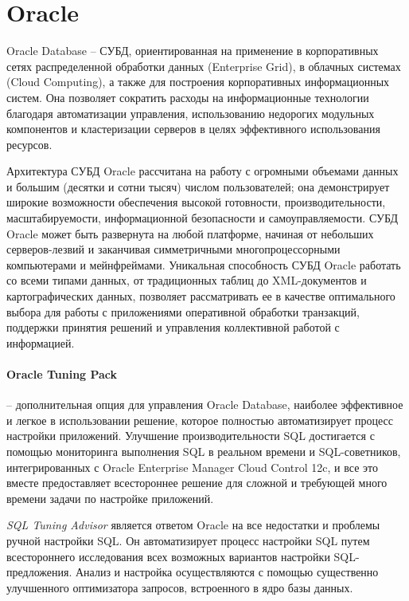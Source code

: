 \section{Oracle}

Oracle Database – СУБД, ориентированная на применение в корпоративных сетях распределенной обработки данных (Enterprise Grid), в облачных системах (Cloud Computing), а также для построения корпоративных информационных систем. Она позволяет сократить расходы на информационные технологии благодаря автоматизации управления, использованию недорогих модульных компонентов и кластеризации серверов в целях эффективного использования ресурсов. 

Архитектура СУБД Oracle рассчитана на работу с огромными объемами данных и большим (десятки и сотни тысяч) числом пользователей; она демонстрирует широкие возможности обеспечения высокой готовности, производительности, масштабируемости, информационной безопасности и самоуправляемости. СУБД Oracle может быть развернута на любой платформе, начиная от небольших серверов-лезвий и заканчивая симметричными многопроцессорными компьютерами и мейнфреймами. Уникальная способность СУБД Oracle работать со всеми типами данных, от традиционных таблиц до XML-документов и картографических данных, позволяет рассматривать ее в качестве оптимального выбора для работы с приложениями оперативной обработки транзакций, поддержки принятия решений и управления коллективной работой с информацией.  

\paragraph{Oracle Tuning Pack} – дополнительная опция для управления Oracle Database, наиболее эффективное и легкое в использовании решение, которое полностью автоматизирует процесс настройки приложений. Улучшение производительности SQL достигается с помощью мониторинга выполнения SQL в реальном времени и SQL-советников, интегрированных с Oracle Enterprise Manager Cloud Control 12c, и все это вместе предоставляет всестороннее решение для сложной и требующей много времени задачи по настройке приложений.

\textit{SQL Tuning Advisor} является ответом Oracle на все недостатки и проблемы ручной настройки SQL. Он автоматизирует процесс настройки SQL путем всестороннего исследования всех возможных вариантов настройки SQL-предложения. Анализ и настройка осуществляются с помощью существенно улучшенного оптимизатора запросов, встроенного в ядро базы данных.

